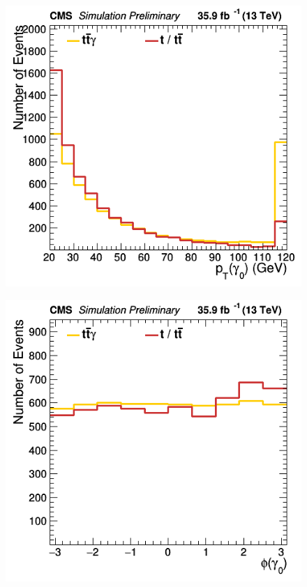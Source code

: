 \documentclass[11pt]{scrartcl}
\begin{document}
	\begin{figure}[H]
	\centering
	\begin{minipage}{.5\textwidth}
	  \centering
	  \includegraphics[width=0.75\linewidth]{figures/Select3/PhotonGood0_pt.png}
	  \label{fig:PhotonGood0pt}
	\end{minipage}%
	\begin{minipage}{.5\textwidth}
	  \centering
	  \includegraphics[width=0.75\linewidth]{figures/Select3/PhotonGood0_phi.png}
	  \label{fig:PhotonGood0phi}
	\end{minipage}
	\end{figure}
	
\end{document}
